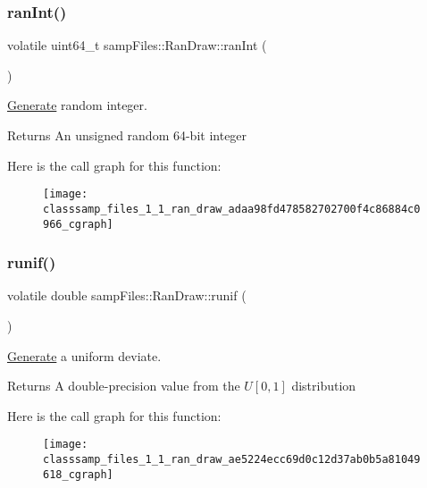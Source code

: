 \subsubsection{\texorpdfstring{ran\+Int()}{ranInt()}}
{\footnotesize\ttfamily volatile uint64\+\_\+t samp\+Files\+::\+Ran\+Draw\+::ran\+Int (\begin{DoxyParamCaption}{ }\end{DoxyParamCaption})\hspace{0.3cm}{\ttfamily [inline]}}



\hyperlink{classsamp_files_1_1_generate}{Generate} random integer. 

\begin{DoxyReturn}{Returns}
An unsigned random 64-\/bit integer 
\end{DoxyReturn}
Here is the call graph for this function\+:\nopagebreak
\begin{figure}[H]
\begin{center}
\leavevmode
\texttt{[image: classsamp\_files\_1\_1\_ran\_draw\_adaa98fd478582702700f4c86884c0966\_cgraph]}
\end{center}
\end{figure}
\mbox{\label{classsamp_files_1_1_ran_draw_ae5224ecc69d0c12d37ab0b5a81049618}} 
\subsubsection{\texorpdfstring{runif()}{runif()}}
{\footnotesize\ttfamily volatile double samp\+Files\+::\+Ran\+Draw\+::runif (\begin{DoxyParamCaption}{ }\end{DoxyParamCaption})\hspace{0.3cm}{\ttfamily [inline]}}



\hyperlink{classsamp_files_1_1_generate}{Generate} a uniform deviate. 

\begin{DoxyReturn}{Returns}
A double-\/precision value from the $ U[0,1]$ distribution 
\end{DoxyReturn}
Here is the call graph for this function\+:\nopagebreak
\begin{figure}[H]
\begin{center}
\leavevmode
\texttt{[image: classsamp\_files\_1\_1\_ran\_draw\_ae5224ecc69d0c12d37ab0b5a81049618\_cgraph]}
\end{center}
\end{figure}
\mbox{\label{classsamp_files_1_1_ran_draw_a5688bd202e487435398b1c1cb6f9ce30}} 
